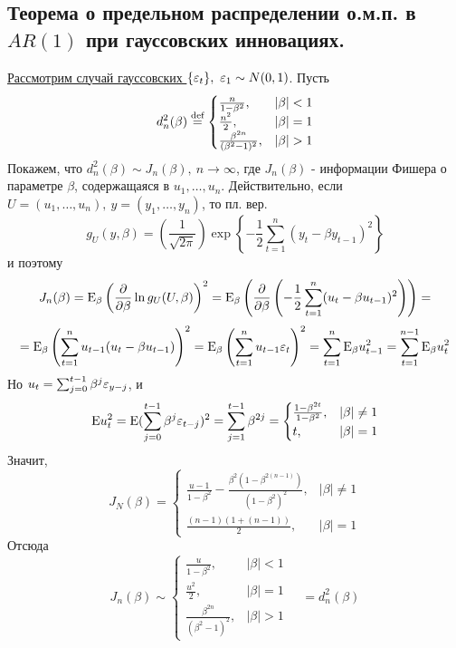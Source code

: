 \subsection{Теорема о предельном распределении о.м.п. в $AR(1)$ при гауссовских
инновациях.}
\underline{Рассмотрим случай гауссовских $\{\varepsilon_t\},\ \varepsilon_1\sim N(0,1)$}. Пусть
\[d_n^2(\beta)\stackrel{\text{def}}{=}\begin{cases}
    \frac{n}{1-\beta^2},& \left\lvert \beta\right\rvert <1 \\
    \frac{n^2}{2},& \left\lvert \beta\right\rvert =1 \\
    \frac{\beta^{2n}}{(\beta^2-1)^2},& \left\lvert \beta\right\rvert >1
\end{cases}\]
Покажем, что $d_n^2(\beta)\sim J_n(\beta),\ n\rightarrow\infty$,
где $J_n(\beta)$ - информации Фишера о параметре $\beta$,
содержащаяся в $u_1,\ldots,u_n$. Действительно,
если $U=(u_1,\ldots,u_n),\ y=(y_1,\ldots,y_n)$, то пл. вер.
\[g_U(y,\beta)=\left(\frac{1}{\sqrt{2\pi}}\right)\exp{\left\{-\frac{1}{2}\sum_{t=1}^n(y_t-\beta y_{t-1})^2\right\}}\]
и поэтому
\[J_n(\beta)=\mathrm{E}_{\beta}\left(\frac{\partial}{\partial\beta}\ln g_U(U,\beta)\right)^2=\mathrm{E}_\beta\left(\frac{\partial}{\partial\beta}\left(-\frac{1}{2}\sum_{t=1}^n(u_t-\beta u_{t-1})^2\right)\right)=\]
\[=\mathrm{E}_\beta\left(\sum_{t=1}^nu_{t-1}(u_t-\beta u_{t-1})\right)^2=\mathrm{E}_\beta\left(\sum_{t=1}^nu_{t-1}\varepsilon_t\right)^2=\sum_{t=1}^n\mathrm{E}_\beta u^2_{t-1}=\sum_{t=1}^{n-1}\mathrm{E}_\beta u^2_{t}\]
Но $u_t=\sum_{j=0}^{t-1}\beta^j\varepsilon_{y-j}$, и
\[\mathrm{E} u_t^2=\mathrm{E}(\sum_{j=0}^{t-1}\beta^j\varepsilon_{t-j})^2=\sum_{j=1}^{t-1}\beta^{2j}=\begin{cases}
    \frac{1-\beta^{2t}}{1-\beta^2},& \left\lvert \beta\right\rvert \neq1 \\
    t,& \left\lvert \beta\right\rvert =1
\end{cases}\]
Значит,
\[J_N(\beta)=\begin{cases}
    \frac{u-1}{1-\beta^2}-\frac{\beta^2(1-\beta^{2(n-1)})}{(1-\beta^2)^2},& \left\lvert \beta\right\rvert \neq1\\
    \frac{(n-1)(1+(n-1))}{2},& \left\lvert \beta\right\rvert  =1
\end{cases}\]
Отсюда
\[
    J_n(\beta)\sim\begin{cases}
        \frac{u}{1-\beta^2},& \left\lvert \beta\right\rvert <1 \\
        \frac{u^2}{2},& \left\lvert \beta\right\rvert =1 \\
        \frac{\beta^{2n}}{(\beta^2-1)^2},& \left\lvert \beta\right\rvert >1
    \end{cases}
    \quad =d^2_n(\beta)
\]
